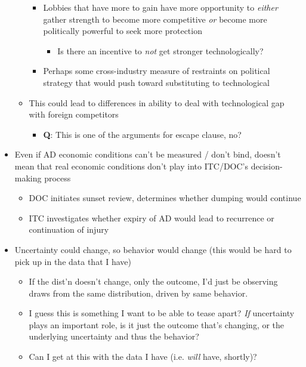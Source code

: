 \documentclass[12pt]{article}
\begin{document}
\begin{itemize}
\begin{itemize}
\begin{itemize}
					\item Lobbies that have more to gain have more opportunity to \textit{either} gather strength to become more competitive \textit{or} become more politically powerful to seek more protection
						\begin{itemize}
							\item Is there an incentive to \textit{not} get stronger technologically?
						\end{itemize}
					\item Perhaps some cross-industry measure of restraints on political strategy that would push toward substituting to technological
				\end{itemize}
			\item This could lead to differences in ability to deal with technological gap with foreign competitors 
				\begin{itemize}
					\item \textbf{Q}: This is one of the arguments for escape clause, no?
				\end{itemize}
		\end{itemize}
	\item Even if AD economic conditions can't be measured / don't bind, doesn't mean that real economic conditions don't play into ITC/DOC's decision-making process
		\begin{itemize}
			\item DOC initiates sunset review, determines whether dumping would continue
			\item ITC investigates whether expiry of AD would lead to recurrence or continuation of injury
		\end{itemize}
	\item Uncertainty could change, so behavior would change (this would be hard to pick up in the data that I have)
		\begin{itemize}
			\item If the dist'n doesn't change, only the outcome, I'd just be observing draws from the same distribution, driven by same behavior.
			\item I guess this is something I want to be able to tease apart? \textit{If} uncertainty plays an important role, is it just the outcome that's changing, or the underlying uncertainty and thus the behavior?
			\item Can I get at this with the data I have (i.e. \textit{will} have, shortly)?
		\end{itemize}
\end{itemize}
\end{document}
